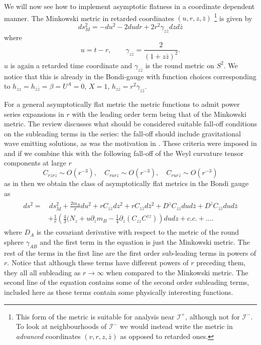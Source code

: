 \documentclass[a4paper,11pt]{article}
\numberwithin{equation}{section}
\begin{document}
We will now see how to implement asymptotic flatness in a coordinate dependent manner. The Minkowski metric in retarded coordinates $(u,r,z,\bar{z})$ \footnote{This form of the metric is suitable for analysis near $\mathscr{I^+}$, although not for $\mathscr{I^-}$. To look at neighbourhoods of $\mathscr{I^-}$ we would instead write the metric in \textit{advanced} coordinates $(v,r,z,\bar{z})$ as opposed to retarded ones.} is given by 
\begin{equation}
ds_{M}^2=-du^2-2dudr+2r^2\gamma_{z \bar{z}}dzd\bar{z}
\end{equation} 
where 
\begin{equation}
u=t-r , \qquad \gamma_{z \bar{z}}=\frac{2}{(1+z\bar{z})^2}.
\end{equation}
$u$ is again a retarded time coordinate and $\gamma_{z\bar{z}}$ is the round metric on $S^2$. We notice that this is already in the Bondi-gauge with function choices corresponding to $h_{zz}=h_{\bar{z} \bar{z}}= \beta= U^A=0$, $X=1$, $h_{z \bar{z}}=r^2 \gamma_{z \bar{z}}$. 

For a general asymptotically flat metric the metric functions to admit power series expansions in $r$ with the leading order term being that of the Minkowski metric. The review \cite{Strominger:2017zoo} discusses what should be considered suitable fall-off conditions on the subleading terms in the series: the fall-off should include gravitational wave emitting solutions, as was the motivation in \cite{Bondi:1962px}. These criteria were imposed in \cite{Bondi:1962px, Sachs:1962wk} and if we combine this with the following fall-off of the Weyl curvature tensor components at large $r$
\begin{equation}
C_{rzrz} \sim O(r^{-3}), \quad C_{rurz} \sim O(r^{-3}), \quad C_{rur\bar{z}} \sim O(r^{-3})
\end{equation}
as in \cite{Strominger:2017zoo} then we obtain the class of asymptotically flat metrics in the Bondi gauge as 
\begin{align}
\begin{split}
ds^2=&\, ds_{M}^2+\frac{2m_B}{r}du^2+rC_{zz}dz^2+rC_{\bar{z} \bar{z}}d\bar{z}^2+D^zC_{zz}dud\bar{z}+D^{\bar{z}}C_{\bar{z}\bar{z}}dud\bar{z} \\
& +\frac{1}{r}\left(\frac{4}{3}(N_z+u\partial_z m_B -\frac{1}{4}\partial_z(C_{zz}C^{zz})\right)dudz + c.c.+ \ldots.
\end{split}
\end{align}
where $D_A$ is the covariant derivative with respect to the metric of the round sphere $\gamma_{AB}$ and the first term in the equation is just the Minkowski metric. The rest of the terms in the first line are the first order sub-leading terms in powers of $r$. Notice that although these terms have different powers of $r$ preceding them, they all all subleading as $r \rightarrow \infty$ when compared to the Minkowski metric. The second line of the equation contains some of the second order subleading terms, included here as these terms contain some physically interesting functions. \par
\end{document}

